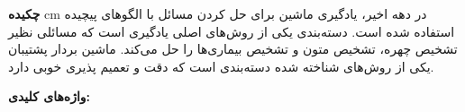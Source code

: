 
\thispagestyle{plain}


\noindent
\textbf{\Large چکیده}
 cm
\noindent در دهه اخیر، یادگیری ماشین برای حل کردن مسائل با الگوهای پیچیده استفاده شده است. دسته‌بندی یکی از روش‌های اصلی یادگیری است که مسائلی نظیر تشخیص چهره، تشخیص متون و تشخیص بیماری‌ها را حل می‌کند. ماشین بردار پشتیبان یکی از روش‌های شناخته شده  دسته‌بندی است که دقت و تعمیم پذیری خوبی دارد.

\vskip 3cm
\noindent
\textbf{واژه‌های کلیدی:}
